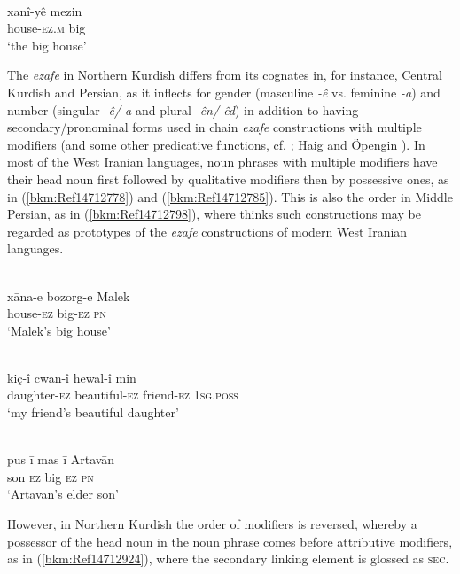 \documentclass[output=paper]{langsci/langscibook}
\begin{document}
\ea\label{ex:opengin:}
\\
\gll xanî-yê mezin\\
     house-\textsc{ez.m} big\\
\glt ‘the big house’
\z

The \textit{ezafe} in Northern Kurdish differs from its cognates in, for instance, Central Kurdish and Persian, as it inflects for gender (masculine \textit{{}-ê} vs. feminine \textit{{}-a}) and number (singular \textit{{}-ê/-a} and plural \textit{{}-ên/-êd}) in addition to having secondary/pronominal forms used in chain \textit{ezafe} constructions with multiple modifiers (and some other predicative functions, cf. \citet{Haig2011}; Haig and Öpengin ). In most of the West Iranian languages, noun phrases with multiple modifiers have their head noun first followed by qualitative modifiers then by possessive ones, as in (\ref{bkm:Ref14712778}) and (\ref{bkm:Ref14712785}). This is also the order in Middle Persian, as in (\ref{bkm:Ref14712798}), where \citet[122]{Tsabolov1994} thinks such constructions may be regarded as prototypes of the \textit{ezafe} constructions of modern West Iranian languages. 

\ea\label{ex:opengin:}
\\
\gll xāna-e bozorg-e Malek\\
     house-\textsc{ez} big-\textsc{ez} \textsc{pn}\\
\glt ‘Malek’s big house’
\z

\ea\label{ex:opengin:}
\\
\gll kiç-î cwan-î hewal-î min\\
     daughter-\textsc{ez} beautiful-\textsc{ez} friend-\textsc{ez} 1\textsc{sg.poss}\\
\glt ‘my friend’s beautiful daughter’
\z

\ea\label{ex:opengin:}
\\
\gll pus ī mas ī Artavān\\
     son \textsc{ez} big \textsc{ez} \textsc{pn}\\
\glt ‘Artavan’s elder son’
\z

However, in Northern Kurdish the order of modifiers is reversed, whereby a possessor of the head noun in the noun phrase comes before attributive modifiers, as in (\ref{bkm:Ref14712924}), where the secondary linking element is glossed as \textsc{sec}.  
\end{document}
